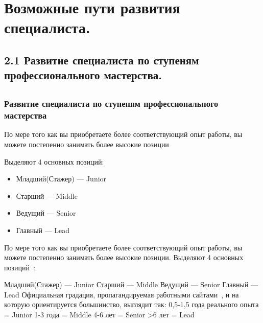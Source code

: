 \documentclass{../industrial-development}
\begin{document}
\section{Возможные пути развития специалиста. }

\subsection{2.1 Развитие  специалиста по ступеням профессионального мастерства. }


\subsection{}

\begin{frame} \frametitle{Развитие  специалиста по ступеням профессионального мастерства}
  \begin{block}{}
  По мере того как вы приобретаете более соответствующий опыт работы, вы можете постепенно занимать более высокие позиции

 Выделяют 4 основных позиций:
  \end{block}
  
  \begin{itemize}
  \item Младший(Стажер) --- Junior
  \item Старший --- Middle
  \item Ведущий --- Senior
 \item Главный --- Lead
  \end{itemize}
\end{frame}

\lecturenotes
 По мере того как вы приобретаете более соответствующий опыт работы, вы можете постепенно занимать более высокие позиции. Выделяют 4 основных позиций~\cite{JMSL}:

Младший(Стажер) --- Junior
Старший --- Middle
Ведущий --- Senior
 Главный --- Lead
Официальная градация, пропагандируемая работными сайтами~\cite{hh}, и на которую ориентируется большинство, выглядит так:
	0,5-1,5 года реального опыта = Junior
	1-3 года = Middle 
	4-6 лет = Senior
	>6 лет = Lead
\end{document}
